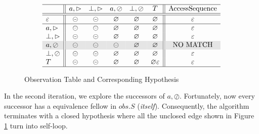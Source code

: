 \documentclass[conference, a4paper]{IEEEtran}
\newcommand{\rblock}[0]{\circleddash}
\newcommand{\rread}[0]{\rhd}
\newcommand{\rnoread}[0]{\oslash}
\newcommand{\rempty}[0]{\varnothing}
\begin{document}
\begin{figure}[ht]
  \begin{center}
    \begin{displaymath}
      \begin{array}{l||ccccc||c}
        \hline
        & a,\rread & \bot,\rread & a,\rnoread & \bot,\rnoread & T & \mbox{AccessSequence}\\
        \hline\hline
        \varepsilon & \rblock & \rblock & \rempty & \rempty & \rempty & \varepsilon\\
        \hline
        a,\rread & \rblock & \rblock & \rempty & \rempty & \rempty & \varepsilon\\
        \bot,\rread & \rblock & \rblock & \rempty & \rempty & \rempty & \varepsilon \\
        \rowcolor[gray]{.9}
        a,\rnoread & \rblock & \rblock & \rblock & \rempty & \rempty & \mbox{NO MATCH}\\
        \bot,\rnoread & \rblock & \rblock & \rempty & \rempty & \rempty & \varepsilon \\
        T & \rblock & \rblock & \rempty & \rempty & \rempty \varepsilon & \varepsilon \\
        \hline
      \end{array}
    \end{displaymath}
  \end{center}
  \caption{Observation Table and Corresponding Hypothesis}
  \label{fig:hypo}
\end{figure}

In the second iteration, we explore the successors of $a,\rnoread$. Fortunately, now every
successor has a equivalence fellow in $obs.S$ (\emph{itself}). Consequently, the algorithm terminates
with a closed hypothesis where all the unclosed edge shown in Figure \ref{fig:hypo} turn into
self-loop.
\end{document}
